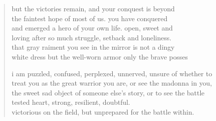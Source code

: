 \begin{verse}
but the victories remain, and your conquest is beyond \\
the faintest hope of most of us. you have conquered \\
and emerged a hero of your own life. open, sweet and \\
loving after so much struggle, setback and loneliness. \\
that gray raiment you see in the mirror is not a dingy \\
white dress but the well-worn armor only the brave posses

i am puzzled, confused, perplexed, unnerved, unsure of whether to \\
treat you as the great warrior you are, or see the madonna in you, \\
the sweet sad object of someone else's story, or to see the battle \\
tested heart, strong, resilient, doubtful. \\
victorious on the field, but unprepared for the battle within.
\end{verse}
